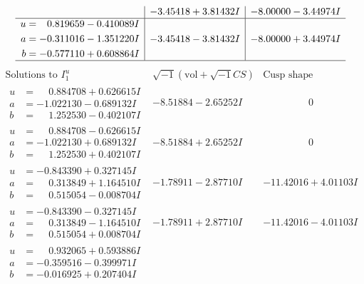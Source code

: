 \documentclass[1p]{elsarticle_modified}
\theoremstyle{definition}
\newcommand{\I}{\sqrt{-1}}
\begin{document}
$$\begin{array}{c|c|c}
 & -3.45418 + 3.81432 I & -8.00000 - 3.44974 I \\ \hline\begin{aligned}
u &= \phantom{-}0.819659 - 0.410089 I \\
a &= -0.311016 - 1.351220 I \\
b &= -0.577110 + 0.608864 I\end{aligned}
 & -3.45418 - 3.81432 I & -8.00000 + 3.44974 I\\
 \hline 
 \end{array}$$\newpage$$\begin{array}{c|c|c}  
\text{Solutions to }I^u_{1}& \I (\text{vol} + \sqrt{-1}CS) & \text{Cusp shape}\\
 \hline 
\begin{aligned}
u &= \phantom{-}0.884708 + 0.626615 I \\
a &= -1.022130 - 0.689132 I \\
b &= \phantom{-}1.252530 - 0.402107 I\end{aligned}
 & -8.51884 - 2.65252 I & \phantom{-0.000000 } 0 \\ \hline\begin{aligned}
u &= \phantom{-}0.884708 - 0.626615 I \\
a &= -1.022130 + 0.689132 I \\
b &= \phantom{-}1.252530 + 0.402107 I\end{aligned}
 & -8.51884 + 2.65252 I & \phantom{-0.000000 } 0 \\ \hline\begin{aligned}
u &= -0.843390 + 0.327145 I \\
a &= \phantom{-}0.313849 + 1.164510 I \\
b &= \phantom{-}0.515054 - 0.008704 I\end{aligned}
 & -1.78911 - 2.87710 I & -11.42016 + 4.01103 I \\ \hline\begin{aligned}
u &= -0.843390 - 0.327145 I \\
a &= \phantom{-}0.313849 - 1.164510 I \\
b &= \phantom{-}0.515054 + 0.008704 I\end{aligned}
 & -1.78911 + 2.87710 I & -11.42016 - 4.01103 I \\ \hline\begin{aligned}
u &= \phantom{-}0.932065 + 0.593886 I \\
a &= -0.359516 - 0.399971 I \\
b &= -0.016925 + 0.207404 I\end{aligned}

\end{array}$$
\end{document}
